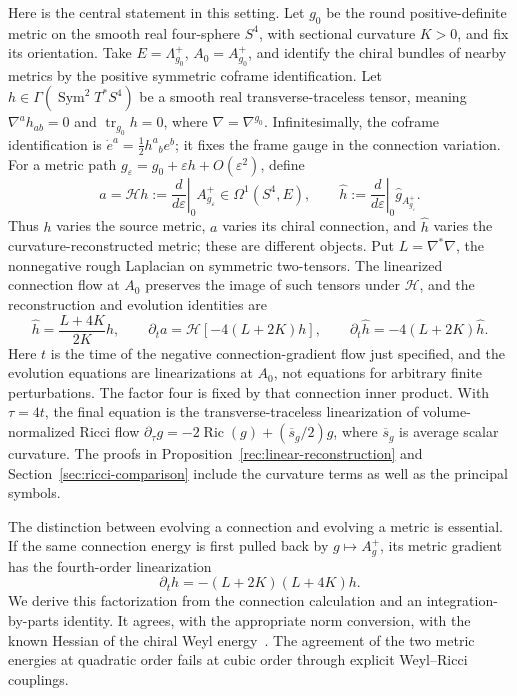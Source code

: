 \documentclass[11pt]{article}
\numberwithin{equation}{section}
\theoremstyle{definition}
\theoremstyle{remark}
\DeclareMathOperator{\Ric}{Ric}
\begin{document}
Here is the central statement in this setting. Let \(g_0\) be the round
positive-definite metric on the smooth real four-sphere \(S^4\), with
sectional curvature \(K>0\), and fix its orientation. Take
\(E=\Lambda_{g_0}^+\), \(A_0=A_{g_0}^+\), and identify the chiral
bundles of nearby metrics by the positive symmetric coframe identification.
Let \(h\in\Gamma(\operatorname{Sym}^2T^*S^4)\) be a smooth real
transverse-traceless tensor, meaning
\(\nabla^a h_{ab}=0\) and \(\operatorname{tr}_{g_0}h=0\), where
\(\nabla=\nabla^{g_0}\). Infinitesimally, the coframe identification is
\(\dot e^a=\tfrac12h^a{}_b e^b\); it fixes the frame gauge in the
connection variation. For a metric path
\(g_\varepsilon=g_0+\varepsilon h+O(\varepsilon^2)\), define
\[
 a=\mathcal Hh:=\left.\frac{d}{d\varepsilon}\right|_0A_{g_\varepsilon}^+
       \in\Omega^1(S^4,E),\qquad
 \widehat h:=\left.\frac{d}{d\varepsilon}\right|_0
                 \widehat g_{A_{g_\varepsilon}^+}.
\]
Thus \(h\) varies the source metric, \(a\) varies its chiral connection,
and \(\widehat h\) varies the curvature-reconstructed metric; these are
different objects. Put \(L=\nabla^*\nabla\), the nonnegative rough
Laplacian on symmetric two-tensors. The linearized connection flow at
\(A_0\) preserves the image of such tensors under \(\mathcal H\), and
the reconstruction and evolution identities are
\begin{equation}\label{eq:intro-main}
\widehat h=\frac{L+4K}{2K}h,\qquad
\partial_ta=\mathcal H[-4(L+2K)h],\qquad
\partial_t\widehat h=-4(L+2K)\widehat h.
\end{equation}
Here \(t\) is the time of the negative connection-gradient flow just
specified, and the evolution equations are linearizations at \(A_0\),
not equations for arbitrary finite perturbations. The factor four is fixed
by that connection inner product. With \(\tau=4t\), the final equation is
the transverse-traceless linearization of volume-normalized Ricci flow
\(\partial_\tau g=-2\Ric(g)+(\overline s_g/2)g\), where
\(\overline s_g\) is average scalar curvature. The proofs in
Proposition~\ref{rec:linear-reconstruction} and
Section~\ref{sec:ricci-comparison} include the curvature terms as well as
the principal symbols.

The distinction between evolving a connection and evolving a metric is essential. If the same connection energy is first pulled back by \(g\mapsto A_g^+\), its metric gradient has the fourth-order linearization
\begin{equation}\label{eq:intro-fourth}
\partial_th=-(L+2K)(L+4K)h.
\end{equation}
We derive this factorization from the connection calculation and an integration-by-parts identity. It agrees, with the appropriate norm conversion, with the known Hessian of the chiral Weyl energy~\cite{GurskyViaclovsky2015}. The agreement of the two metric energies at quadratic order fails at cubic order through explicit Weyl--Ricci couplings.
\end{document}
